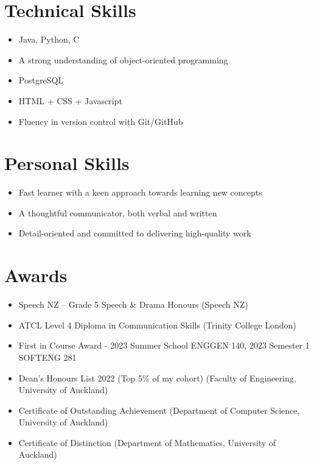 \documentclass[a4paper,12pt]{article}
\begin{document}
\section{Technical Skills}

\begin{itemize}
    \item Java, Python, C
    \item A strong understanding of object-oriented programming
    \item PostgreSQL
    \item HTML + CSS + Javascript
    \item Fluency in version control with Git/GitHub
\end{itemize}

\section{Personal Skills}

\begin{itemize}
    \item Fast learner with a keen approach towards learning new concepts
    \item A thoughtful communicator, both verbal and written
    \item Detail-oriented and committed to delivering high-quality work
\end{itemize}

\section{Awards}

\begin{itemize}
    \item Speech NZ – Grade 5 Speech \& Drama Honours (Speech NZ)
    \item ATCL Level 4 Diploma in Communication Skills (Trinity College London)
    \item First in Course Award - 2023 Summer School ENGGEN 140, 2023 Semester 1 SOFTENG 281
    \item Dean’s Honours List 2022 (Top 5\% of my cohort) (Faculty of Engineering, University of Auckland)
    \item Certificate of Outstanding Achievement (Department of Computer Science, University of Auckland)
    \item Certificate of Distinction (Department of Mathematics, University of Auckland)
\end{itemize}

\vfill
{}
\end{document}

